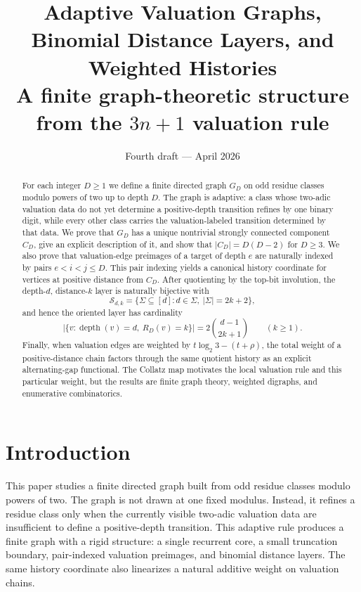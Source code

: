 \documentclass[11pt]{article}
\title{Adaptive Valuation Graphs, Binomial Distance Layers, and Weighted Histories\\
\large A finite graph-theoretic structure from the \texorpdfstring{$3n+1$}{3n+1} valuation rule}
\author{}
\date{Fourth draft --- April 2026}
\theoremstyle{definition}
\theoremstyle{remark}
\newcommand{\depth}{\operatorname{depth}}
\newcommand{\Sfam}{\mathcal S}
\begin{document}
\maketitle

\begin{abstract}
For each integer $D\ge 1$ we define a finite directed graph $G_D$ on odd residue classes modulo powers of two up to depth $D$.  The graph is adaptive: a class whose two-adic valuation data do not yet determine a positive-depth transition refines by one binary digit, while every other class carries the valuation-labeled transition determined by that data.  We prove that $G_D$ has a unique nontrivial strongly connected component $C_D$, give an explicit description of it, and show that $|C_D|=D(D-2)$ for $D\ge3$.  We also prove that valuation-edge preimages of a target of depth $e$ are naturally indexed by pairs $e<i<j\le D$.  This pair indexing yields a canonical history coordinate for vertices at positive distance from $C_D$.  After quotienting by the top-bit involution, the depth-$d$, distance-$k$ layer is naturally bijective with
\[
\Sfam_{d,k}=\{\Sigma\subseteq[d]: d\in\Sigma,\ |\Sigma|=2k+2\},
\]
and hence the oriented layer has cardinality
\[
\bigl|\{v:\depth(v)=d,\ R_D(v)=k\}\bigr|=2\binom{d-1}{2k+1}\qquad(k\ge1).
\]
Finally, when valuation edges are weighted by $t\log_2 3-(t+\rho)$, the total weight of a positive-distance chain factors through the same quotient history as an explicit alternating-gap functional.  The Collatz map motivates the local valuation rule and this particular weight, but the results are finite graph theory, weighted digraphs, and enumerative combinatorics.
\end{abstract}

\section{Introduction}

This paper studies a finite directed graph built from odd residue classes modulo powers of two.  The graph is not drawn at one fixed modulus.  Instead, it refines a residue class only when the currently visible two-adic valuation data are insufficient to define a positive-depth transition.  This adaptive rule produces a finite graph with a rigid structure: a single recurrent core, a small truncation boundary, pair-indexed valuation preimages, and binomial distance layers.  The same history coordinate also linearizes a natural additive weight on valuation chains.
\end{document}
